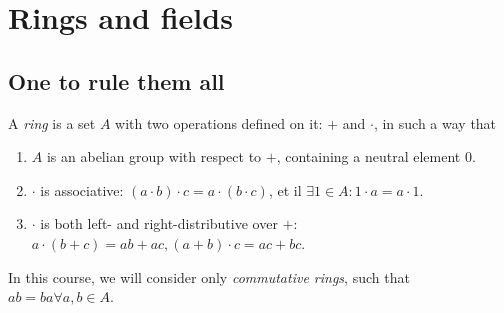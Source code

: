 \chapter{Rings and fields}

\section{One to rule them all}

\begin{definition}
  A \emph{ring} is a set $A$ with two operations defined on it: $+$ and $\cdot$, in such a way that
  \begin{enumerate}
    \item $A$ is an abelian group with respect to $+$, containing a neutral element $0$. 
    \item $\cdot$ is associative: $(a \cdot b) \cdot c = a \cdot (b \cdot c)$, et il $\exists 1 \in A: 1 \cdot a = a \cdot 1$.
    \item  $\cdot$ is both left- and right-distributive over $+$: $a \cdot (b + c) = ab + ac,  (a + b) \cdot c = ac + bc$. 
  \end{enumerate}
\end{definition}

In this course, we will consider only \emph{commutative rings}, such that $ab = ba \forall a, b \in A$. 

